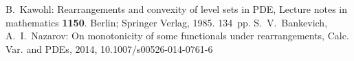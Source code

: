 \begin{thebibliography}{99}
 B.~Kawohl: Rearrangements and convexity of level sets in PDE,
Lecture notes in mathematics {\bf1150}. Berlin; Springer Verlag, 1985. 134~pp.
 S.~V.~Bankevich, A.~I.~Nazarov: On monotonicity of some functionals under rearrangements, Calc. Var. and PDEs, 2014, 10.1007/s00526-014-0761-6
\end{thebibliography}
